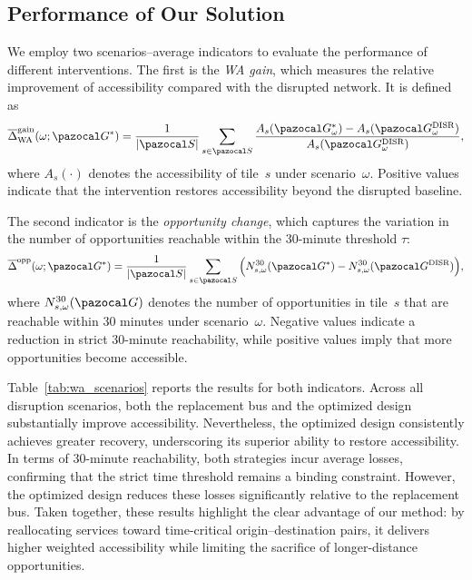 \documentclass[3p,times,procedia]{elsarticle}
\begin{document}
\subsection{Performance of Our Solution}\label{subsec:performance}

We employ two scenarios--average indicators to evaluate the performance of different interventions. The first is the \emph{WA gain}, which measures the relative improvement of accessibility
compared with the disrupted network. It is defined as
\begin{equation}
\overline{\Delta}^\text{gain}_{\text{WA}}(\omega;\pazocal G^\ast)
= \frac{1}{|\pazocal S|}\sum_{s\in\pazocal S}
  \frac{A_{s}(\pazocal G^\ast_\omega) -
        A_{s}(\pazocal G^\text{DISR}_\omega)}
       {A_{s}(\pazocal G^\text{DISR}_\omega)},
\end{equation}
where $A_{s}(\cdot)$ denotes the accessibility of tile~$s$ under scenario~$\omega$. Positive values indicate that the intervention restores accessibility beyond the disrupted baseline.

The second indicator is the \emph{opportunity change}, which captures the variation in the number of opportunities reachable within the 30-minute threshold $\tau$:
\begin{equation}
\overline{\Delta}^{\text{opp}}(\omega;\pazocal G^\ast)
= \frac{1}{|\pazocal S|}\sum_{s\in\pazocal S}
  \Big(N^{30}_{s,\omega}(\pazocal G^\ast) -
       N^{30}_{s,\omega}(\pazocal G^\text{DISR})\Big),
\end{equation}
where $N^{30}_{s,\omega}(\pazocal G)$ denotes the number of opportunities in tile~$s$ that are reachable within 30 minutes under scenario~$\omega$. Negative values indicate a reduction in strict 30-minute reachability, while positive values imply that more opportunities become accessible.

Table~\ref{tab:wa_scenarios} reports the results for both indicators. Across all disruption scenarios, both the replacement bus and the optimized design substantially improve accessibility.
Nevertheless, the optimized design consistently achieves greater recovery, underscoring its superior ability to restore accessibility. In terms of 30-minute reachability, both strategies incur average
losses, confirming that the strict time threshold remains a binding constraint. 
%
However, the optimized design reduces these losses significantly relative to the replacement bus. 
%
Taken together, these results highlight the clear advantage of our method: by reallocating services toward time-critical origin--destination pairs, it delivers higher weighted accessibility while limiting the sacrifice of longer-distance opportunities.
\end{document}
